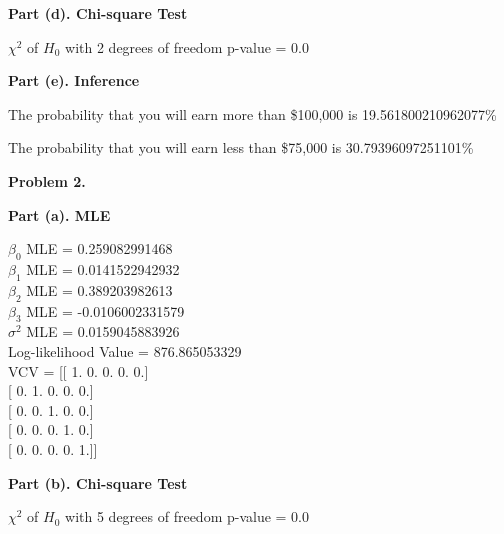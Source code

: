 \documentclass[letterpaper,12pt]{article}
\theoremstyle{definition}
\begin{document}
\begin{enumerate}
  \textbf{Part (d). Chi-square Test}
\par\bigskip
$\chi^2$ of $H_{0}$ with 2 degrees of freedom p-value =  0.0
\par\bigskip
\end {enumerate}

\begin{enumerate}
  \textbf{Part (e). Inference}
\par\bigskip
The probability that you will earn more than \$100,000 is 19.561800210962077\%
\par
The probability that you will earn less than \$75,000 is 30.79396097251101\%
\par\bigskip
\end{enumerate}

\begin{enumerate}
  \textbf{Problem 2.}
\end {enumerate}

\begin{enumerate}
  \textbf{Part (a). MLE}
\par\bigskip
$\beta_{0}$ MLE = 0.259082991468 \\
$\beta_{1}$ MLE = 0.0141522942932 \\
$\beta_{2}$ MLE = 0.389203982613 \\
$\beta_{3}$ MLE = -0.0106002331579 \\
$\sigma^2$ MLE = 0.0159045883926 \\
Log-likelihood Value = 876.865053329 \\
VCV = [[ 1.  0.  0.  0.  0.] \\
\hspace{12mm}   [ 0.  1.  0.  0.  0.] \\
\hspace{12mm}   [ 0.  0.  1.  0.  0.] \\
\hspace{12mm}   [ 0.  0.  0.  1.  0.] \\
\hspace{12mm}   [ 0.  0.  0.  0.  1.]]
\par\bigskip
\end {enumerate}

\begin{enumerate}
  \textbf{Part (b). Chi-square Test}\par\bigskip
$\chi^2$ of $H_{0}$ with 5 degrees of freedom p-value =  0.0
\end {enumerate}
\end{document}
